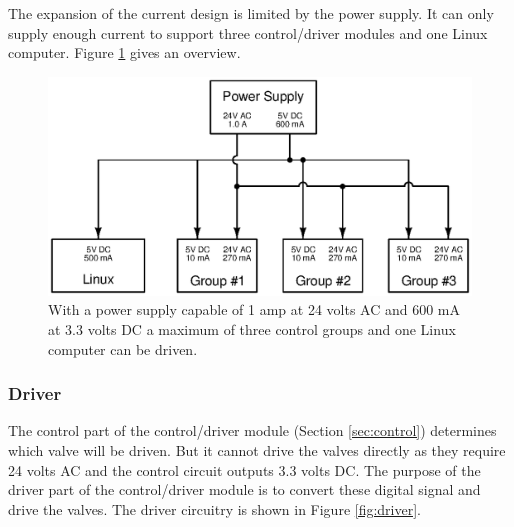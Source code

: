\documentclass{article}
\begin{document}
The expansion of the current design is limited by the power supply.
It can only supply enough current to support three control/driver modules
and one Linux computer.
Figure \ref{fig:expansion_current} gives an overview.

\begin{figure}[hbp]
\centering
\includegraphics[angle=0,scale=0.80]{xcircuit/expansion_current}
\caption{With a power supply capable of 1 amp at 24 volts AC and
600 mA at 3.3 volts DC a maximum of three control groups and one
Linux computer can be driven.}\label{fig:expansion_current}
\end{figure}


\pagebreak

\FloatBarrier
\subsubsection{Driver}
\label{sec:driver}

The control part of the control/driver module (Section \ref{sec:control})
determines which valve will be driven.  But it cannot drive the valves
directly as they require 24 volts AC and the control circuit outputs
3.3 volts DC.
The purpose of the driver part of the control/driver module is to convert
these digital signal and drive the valves.
The driver circuitry is shown in Figure \ref{fig:driver}.
\end{document}
